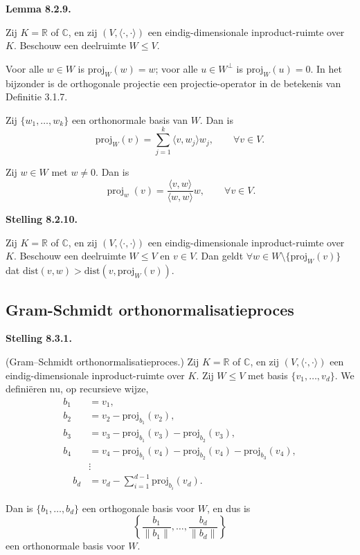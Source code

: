 \documentclass[10pt,a4paper]{article}
\newenvironment{res}[2]{%
  \par\noindent\textbf{#1 #2.}%
}{%
  \par\vspace{2pt}\normalfont
}
\begin{document}
\begin{res}{Lemma}{8.2.9}
Zij $K=\mathbb R$ of $\mathbb C$, en zij $(V,\langle\cdot,\cdot\rangle)$ een eindig-dimensionale inproduct-ruimte over $K$. Beschouw een deelruimte $W\le V$.
\begin{myenum}
\item Voor alle $w\in W$ is $\mathrm{proj}_W(w)=w$; voor alle $u\in W^\perp$ is $\mathrm{proj}_W(u)=0$. In het bijzonder is de orthogonale projectie een projectie-operator in de betekenis van Definitie 3.1.7.
\item Zij $\{w_1,\dots,w_k\}$ een orthonormale basis van $W$. Dan is
\[
\mathrm{proj}_W(v)=\sum_{j=1}^k \langle v,w_j\rangle w_j,\qquad \forall v \in V.
\]
\item Zij \(w \in W\) met \(w \neq 0\). Dan is
\[  
\operatorname{proj}_w (v) = \frac{\langle v , w \rangle}{\langle w,w\rangle}w, \qquad \forall v \in V.
\]
\end{myenum}
\end{res}

\begin{res}{Stelling}{8.2.10}
Zij $K=\mathbb R$ of $\mathbb C$, en zij $(V,\langle\cdot,\cdot\rangle)$ een eindig-dimensionale inproduct-ruimte over $K$.
Beschouw een deelruimte $W\le V$ en $v\in V$. Dan geldt $\forall w\in W\setminus\{\mathrm{proj}_W(v)\}$ dat $\mathrm{dist}(v,w)>\mathrm{dist}(v,\mathrm{proj}_W(v))$.
\end{res}
\subsection{Gram-Schmidt orthonormalisatieproces}
\begin{res}{Stelling}{8.3.1}
\textup{(Gram--Schmidt orthonormalisatieproces.)} 
Zij $K=\mathbb R$ of $\mathbb C$, en zij $(V,\langle\cdot,\cdot\rangle)$ een eindig-dimensionale inproduct-ruimte over $K$.
Zij $W \le V$ met basis $\{v_1,\dots,v_d\}$.
We defini\"eren nu, op recursieve wijze,
\begin{align*}
  b_1&=v_1,\\
  b_2&=v_2-\mathrm{proj}_{b_1}(v_2),\\
  b_3&=v_3-\mathrm{proj}_{b_1}(v_3)-\mathrm{proj}_{b_2}(v_3),\\
  b_4&=v_4-\mathrm{proj}_{b_1}(v_4)-\mathrm{proj}_{b_2}(v_4)-\mathrm{proj}_{b_3}(v_4),\\
  &\vdots\\
  \quad b_d&=v_d-\sum_{i=1}^{d-1}\mathrm{proj}_{b_i}(v_d).
\end{align*}

Dan is $\{b_1,\dots,b_d\}$ een orthogonale basis voor $W$, en dus is
\[
\left\{\frac{b_1}{\|b_1\|},\dots,\frac{b_d}{\|b_d\|}\right\}
\]
een orthonormale basis voor $W$.
\end{res}
\end{document}
